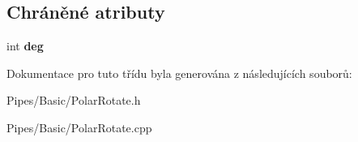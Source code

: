 \subsection*{Chráněné atributy}
\begin{DoxyCompactItemize}
\item 
\hypertarget{class_ar_pipe_1_1_polar_rotate_a98cf74e421e5a40a214605b9dc884c64}{int {\bfseries deg}}\label{da/dd5/class_ar_pipe_1_1_polar_rotate_a98cf74e421e5a40a214605b9dc884c64}

\end{DoxyCompactItemize}


Dokumentace pro tuto třídu byla generována z následujících souborů\-:\begin{DoxyCompactItemize}
\item 
Pipes/\-Basic/Polar\-Rotate.\-h\item 
Pipes/\-Basic/Polar\-Rotate.\-cpp\end{DoxyCompactItemize}
